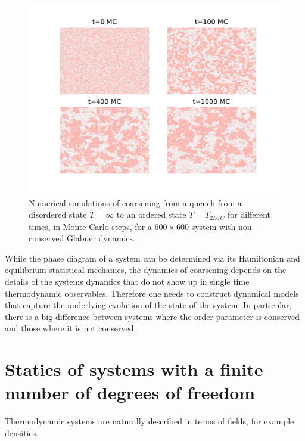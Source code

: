 \begin{figure}[t]
    \centering
    \includegraphics[width=\linewidth]{intro/clusterization.pdf}
    \caption{Numerical simulations of coarsening from a quench from a disordered state $T=\infty$ to an ordered state  $T=T_{2D,C}$ \cite{onsager_crystal_1944} for different times, in Monte Carlo steps, for a $600 \times 600$ system with non-conserved Glabuer dynamics.}
    \label{clusterization}
\end{figure}

While the phase diagram of a system can be determined via its Hamiltonian and equilibrium statistical mechanics, the dynamics of coarsening depends on {\color{red} the} details of the systems dynamics that do not show up in single time thermodynamic observables. Therefore one needs to construct dynamical models that capture the underlying evolution of the state of the system. In particular, there is a big difference between systems where the order parameter is conserved and those where it is not conserved.

    \section{Statics of systems with a finite number of degrees of freedom}


Thermodynamic systems are naturally described in terms of fields, for example densities. 

